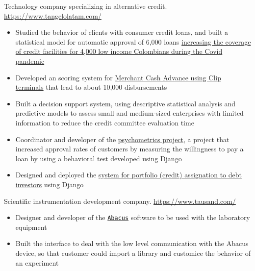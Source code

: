 \documentclass[11pt, letterpaper, sans]{moderncv}
\begin{document}
    {
        Technology company specializing in alternative credit. \url{https://www.tangelolatam.com/}
        \vspace{3pt}
        \begin{itemize}
            \item Studied the behavior of clients with consumer credit loans, and built a statistical model for automatic approval of 6,000 loans \href{https://forbes.co/2020/05/13/emprendedores/zinobe-obtiene-us30-millones-en-financiacion-para-otorgar-mas-creditos-digitales}{\color{color1} increasing the coverage of credit facilities for 4,000 low income Colombians during the Covid pandemic}
            \item Developed an scoring system for \href{https://tekiosmag.com/2022/03/31/fintech-tangelo-anuncia-alianza-con-el-unicornio-mexicano-clip-y-dell-leasing/}{\color{color1} Merchant Cash Advance using Clip terminals} that lead to about 10,000 disbursements 
            \item Built a decision support system, using descriptive statistical analysis and predictive models to assess small and medium-sized enterprises with limited information to reduce the credit committee evaluation time
            \item Coordinator and developer of the \href{https://psychometrics.zinobe.com/v1/}{\color{color1} psychometrics project}, a project that increased approval rates of customers by measuring the willingness to pay a loan by using a behavioral test developed using {\color{color3} Django}
            \item Designed and deployed the \href{https://contxto.com/es/fondeo/fintech-zinobe-levanta-inversion-monachil-capital-partners/}{\color{color1} system for portfolio (credit) assignation to debt investors} using {\color{color3} Django}
        \end{itemize}
    }

    {
        Scientific instrumentation development company. \url{https://www.tausand.com/}
        \vspace{3pt}
        \begin{itemize}
            \item Designer and developer of the  \href{https://www.tausand.com/downloads/}{\color{color1} \texttt{Abacus}} software to be used with the laboratory equipment
            \item Built the interface to deal with the low level communication with the Abacus device, so that customer could import a library and customice the behavior of an experiment 
        \end{itemize}
    }
\end{document}
